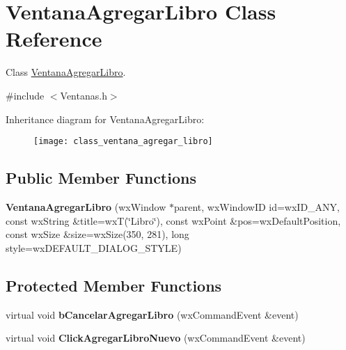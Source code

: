 \hypertarget{class_ventana_agregar_libro}{}\section{Ventana\+Agregar\+Libro Class Reference}
\label{class_ventana_agregar_libro}


Class \hyperlink{class_ventana_agregar_libro}{Ventana\+Agregar\+Libro}.  




{\ttfamily \#include $<$Ventanas.\+h$>$}

Inheritance diagram for Ventana\+Agregar\+Libro\+:\begin{figure}[H]
\begin{center}
\leavevmode
\texttt{[image: class\_ventana\_agregar\_libro]}
\end{center}
\end{figure}
\subsection*{Public Member Functions}
\begin{DoxyCompactItemize}
\item 
{\bfseries Ventana\+Agregar\+Libro} (wx\+Window $\ast$parent, wx\+Window\+ID id=wx\+I\+D\+\_\+\+A\+NY, const wx\+String \&title=wxT(\char`\"{}Libro\char`\"{}), const wx\+Point \&pos=wx\+Default\+Position, const wx\+Size \&size=wx\+Size(350, 281), long style=wx\+D\+E\+F\+A\+U\+L\+T\+\_\+\+D\+I\+A\+L\+O\+G\+\_\+\+S\+T\+Y\+LE)\hypertarget{class_ventana_agregar_libro_abe337ae1ac04d4485b962dd057a0c309}{}\label{class_ventana_agregar_libro_abe337ae1ac04d4485b962dd057a0c309}

\end{DoxyCompactItemize}
\subsection*{Protected Member Functions}
\begin{DoxyCompactItemize}
\item 
virtual void {\bfseries b\+Cancelar\+Agregar\+Libro} (wx\+Command\+Event \&event)\hypertarget{class_ventana_agregar_libro_a76c200b1b15ae50c687ef033a193749d}{}\label{class_ventana_agregar_libro_a76c200b1b15ae50c687ef033a193749d}

\item 
virtual void {\bfseries Click\+Agregar\+Libro\+Nuevo} (wx\+Command\+Event \&event)\hypertarget{class_ventana_agregar_libro_a572f8a6b380f8b79810e7198978d4ab1}{}\label{class_ventana_agregar_libro_a572f8a6b380f8b79810e7198978d4ab1}

\end{DoxyCompactItemize}
